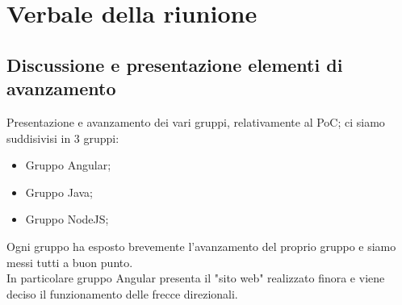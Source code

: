\section{Verbale della riunione}

	\subsection{Discussione e presentazione elementi di avanzamento}
	Presentazione e avanzamento dei vari gruppi, relativamente al PoC; ci siamo suddisivisi in 3 gruppi:
	\begin{itemize}
		\item Gruppo Angular;
		\item Gruppo Java;
		\item Gruppo NodeJS;
	\end{itemize}
	Ogni gruppo ha esposto brevemente l'avanzamento del proprio gruppo e siamo messi tutti a buon punto.\\
	In particolare gruppo Angular presenta il "sito web" realizzato finora e viene deciso il funzionamento delle frecce direzionali.